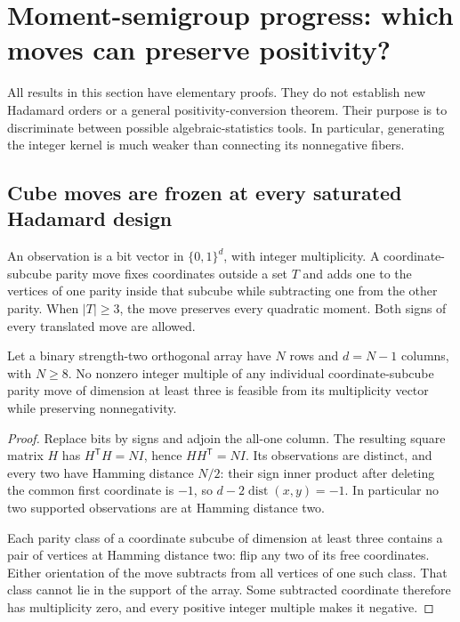 \section{Moment-semigroup progress: which moves can preserve positivity?}
All results in this section have elementary proofs. They do not establish
new Hadamard orders or a general positivity-conversion theorem. Their
purpose is to discriminate between possible algebraic-statistics tools.
In particular, generating the integer kernel is much weaker than connecting
its nonnegative fibers.

\subsection{Cube moves are frozen at every saturated Hadamard design}
An observation is a bit vector in $\{0,1\}^d$, with integer multiplicity.
A coordinate-subcube parity move fixes coordinates outside a set $T$ and
adds one to the vertices of one parity inside that subcube while subtracting
one from the other parity. When $|T|\ge3$, the move preserves every
quadratic moment. Both signs of every translated move are allowed.

\begin{proposition}
Let a binary strength-two orthogonal array have $N$ rows and $d=N-1$
columns, with $N\ge8$. No nonzero integer multiple of any individual
coordinate-subcube parity move of dimension at least three is feasible
from its multiplicity vector while preserving nonnegativity.
\end{proposition}
\begin{proof}
Replace bits by signs and adjoin the all-one column. The resulting square
matrix $H$ has $H^{\mathsf T}H=NI$, hence $HH^{\mathsf T}=NI$. Its
observations are distinct, and every two have Hamming distance $N/2$:
their sign inner product after deleting the common first coordinate is
$-1$, so $d-2\operatorname{dist}(x,y)=-1$. In particular no two
supported observations are at Hamming distance two.

Each parity class of a coordinate subcube of dimension at least three
contains a pair of vertices at Hamming distance two: flip any two of its
free coordinates. Either orientation of the move subtracts from all
vertices of one such class. That class cannot lie in the support of the
array. Some subtracted coordinate therefore has multiplicity zero, and
every positive integer multiple makes it negative.
\end{proof}


